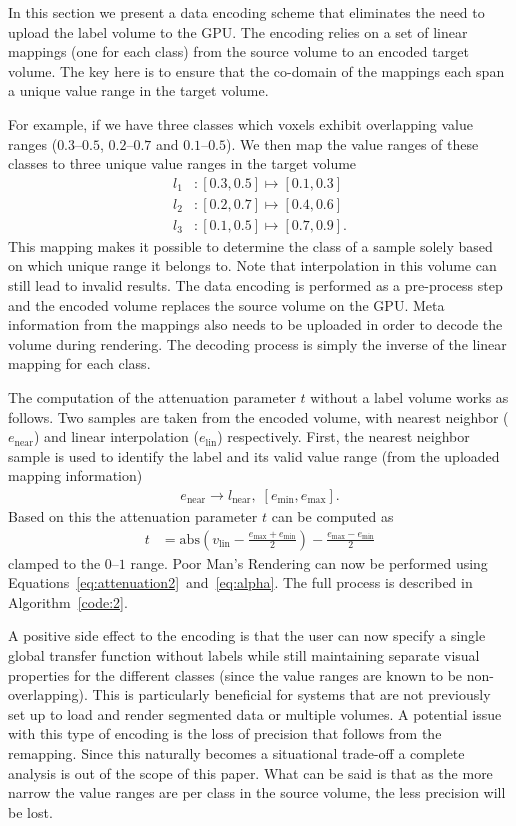 \documentclass{egpubl}
\begin{document}
In this section we present a data encoding scheme that eliminates the need to upload the label volume to the GPU. The encoding relies on a set of linear mappings (one for each class) from the source volume to an encoded target volume. The key here is to ensure that the co-domain of the mappings each span a unique value range in the target volume. 

For example, if we have three classes which voxels exhibit overlapping value ranges ($0.3$--$0.5$, $0.2$--$0.7$ and $0.1$--$0.5$). We then map the value ranges of these classes to three unique value ranges in the target volume
\begin{align}
l_1&: [0.3,0.5] \mapsto [0.1,0.3] \nonumber\\
l_2&: [0.2,0.7] \mapsto [0.4,0.6] \nonumber\\
l_3&: [0.1,0.5] \mapsto [0.7,0.9] \nonumber  .
\end{align}
This mapping makes it possible to determine the class of a sample solely based on which unique range it belongs to. Note that interpolation in this volume can still lead to invalid results. The data encoding is performed as a pre-process step and the encoded volume replaces the source volume on the GPU. Meta information from the mappings also needs to be uploaded in order to decode the volume during rendering. The decoding process is simply the inverse of the linear mapping for each class. 

The computation of the attenuation parameter $t$ without a label volume works as follows. Two samples are taken from the encoded volume, with nearest neighbor ($e_\mathrm{near}$) and linear interpolation ($e_\mathrm{lin}$) respectively. First, the nearest neighbor sample is used to identify the label and its valid value range (from the uploaded mapping information)
\begin{align}
e_\mathrm{near} \rightarrow l_\mathrm{near},\; [e_\mathrm{min}, e_\mathrm{max}]  .
\end{align}
Based on this the attenuation parameter $t$ can be computed as 
\begin{align}
t &= \mathrm{abs}(v_\mathrm{lin} - \frac{e_\mathrm{max} + e_\mathrm{min}}{2}) - \frac{e_\mathrm{max} - e_\mathrm{min}}{2}  \label{eq:attenuation2}
\end{align}
clamped to the $0$--$1$ range. Poor Man's Rendering can now be performed using Equations~\ref{eq:attenuation2}~and~\ref{eq:alpha}. The full process is described in Algorithm~\ref{code:2}.

A positive side effect to the encoding is that the user can now specify a single global transfer function without labels while still maintaining separate visual properties for the different classes (since the value ranges are known to be non-overlapping). This is particularly beneficial for systems that are not previously set up to load and render segmented data or multiple volumes. A potential issue with this type of encoding is the loss of precision that follows from the remapping. Since this naturally becomes a situational trade-off a complete analysis is out of the scope of this paper. What can be said is that as the more narrow the value ranges are per class in the source volume, the less precision will be lost. 
\end{document}
